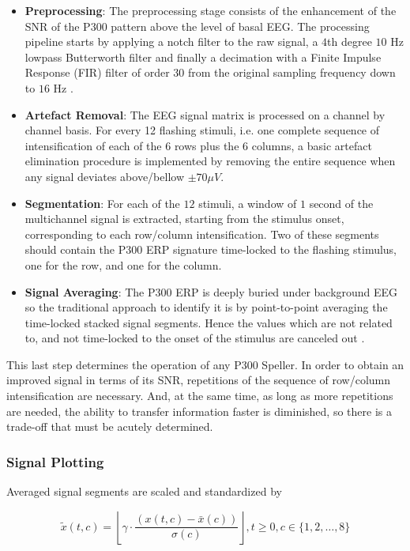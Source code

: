 \documentclass[entropy,article,submit,moreauthors,pdftex,10pt,a4paper]{mdpi}
\begin{document}
\begin{itemize}
\item \textbf{Preprocessing}: The preprocessing stage consists of the enhancement of the SNR of the P300 pattern above the level of basal EEG. The processing pipeline starts by applying a notch filter to the raw signal, a 
$4$th degree $10$ Hz lowpass Butterworth filter and finally a decimation with a Finite Impulse Response (FIR) filter of order $30$ from the original sampling frequency down to $16$ Hz \citep{Krusienski2006}.
\item \textbf{Artefact Removal}: The EEG signal matrix is processed on a channel by channel basis.   For every 12 flashing stimuli, i.e. one complete sequence of intensification of each of the $6$ rows plus the $6$ columns, a basic artefact elimination procedure is implemented by removing the entire sequence when any signal deviates above/bellow $ \pm 70 \mu V $.
\item \textbf{Segmentation}: For each of the $12$ stimuli,  a window of $1$ second of the multichannel signal is extracted, starting from the stimulus onset, corresponding to each row/column intensification.  Two of these segments should contain the P300 ERP signature time-locked to the flashing stimulus, one for the row, and one for the column.
\item \textbf{Signal Averaging}:  The P300 ERP is deeply buried under background EEG so the traditional approach to identify it is by point-to-point averaging the time-locked stacked signal segments.  Hence the values which are not related to, and not time-locked to the onset of the stimulus are canceled out \citep{Liang2008}. 
\end{itemize}

This last step determines the operation of any P300 Speller.  In order to obtain an improved signal in terms of its SNR, repetitions of the sequence of row/column intensification are necessary.  And, at the same time, as long as more repetitions are needed, the ability to transfer information faster is diminished, so there is a trade-off that must be acutely determined.

\subsubsection{Signal Plotting} \label{Plot}

Averaged signal segments are scaled and standardized by 

\begin{equation}
\tilde{x}(t,c) = \left \lfloor{ \gamma \cdot \frac{( x(t,c) - \bar{x}(c)  )}{ \sigma(c) } }\right \rfloor, t\geq 0,c \in \{1,2,\dots,8\}
\end{equation}
\end{document}
